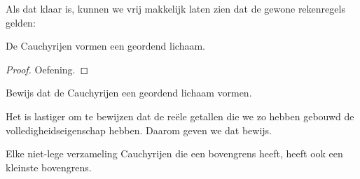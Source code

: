 \documentclass[openany]{memoir}
\begin{document}
Als dat klaar is, kunnen we vrij makkelijk laten zien dat de gewone
rekenregels gelden:
\begin{thm}
De Cauchyrijen vormen een geordend lichaam.
\end{thm}
\begin{proof}
Oefening.
\end{proof}
\begin{prob}
Bewijs dat de Cauchyrijen een geordend lichaam vormen.
\end{prob}
Het is lastiger om te bewijzen dat de reële getallen die we zo hebben
gebouwd de volledigheidseigenschap hebben. Daarom geven we dat bewijs.
\begin{thm}
Elke niet-lege verzameling Cauchyrijen die een bovengrens heeft, heeft
ook een kleinste bovengrens.
\end{thm}
\end{document}
